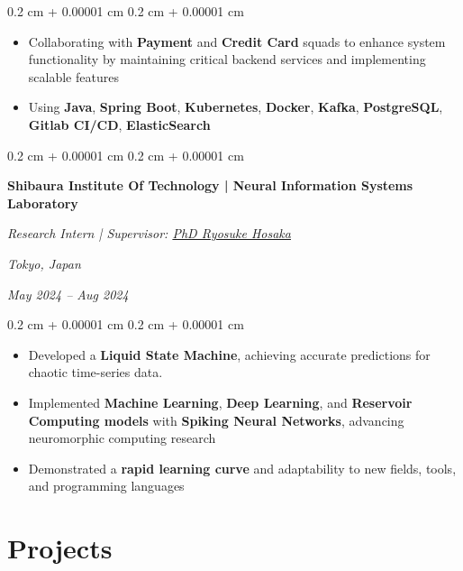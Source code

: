 \documentclass[10pt, letterpaper]{article}
\newenvironment{highlights}{
    \begin{itemize}[
        topsep=0.10 cm,
        parsep=0.10 cm,
        partopsep=0pt,
        itemsep=0pt,
        leftmargin=0.4 cm + 10pt
    ]
}{
    \end{itemize}
} %
\newenvironment{onecolentry}{
    \begin{adjustwidth}{
        0.2 cm + 0.00001 cm
    }{
        0.2 cm + 0.00001 cm
    }
}{
    \end{adjustwidth}
} %
\newenvironment{twocolentry}[2][]{
    \onecolentry
    \def\secondColumn{#2}
    \setcolumnwidth{\fill, 4.5 cm}
    \begin{paracol}{2}
}{
    \switchcolumn \raggedleft \secondColumn
    \end{paracol}
    \endonecolentry
} %
\let\hrefWithoutArrow\href
\renewcommand{\href}[2]{\hrefWithoutArrow{#1}{\ifthenelse{\equal{#2}{}}{ }{#2 }\raisebox{.15ex}{\footnotesize \faExternalLink*}}}
\begin{document}
        \vspace{0.10 cm}
        \begin{onecolentry}
            \begin{highlights}
                \item Collaborating with \textbf{Payment} and \textbf{Credit Card} squads to enhance system functionality by maintaining critical backend services and implementing scalable features
                \item Using \textbf{Java}, \textbf{Spring Boot}, \textbf{Kubernetes}, \textbf{Docker}, \textbf{Kafka}, \textbf{PostgreSQL}, \textbf{Gitlab CI/CD}, \textbf{ElasticSearch}
            \end{highlights}
        \end{onecolentry}   

        \begin{twocolentry}{
        \textit{Tokyo, Japan}    
            
        \textit{May 2024 – Aug 2024}}
            \textbf{Shibaura Institute Of Technology | \textcolor{clearblue}{Neural Information Systems \mbox{Laboratory}}}
            
            \textit{Research Intern | Supervisor: \hrefWithoutArrow{mailto:r-hosaka@shibaura-it.ac.jp}{\color{black}{\footnotesize\faEnvelope[regular]}\hspace*{0.13cm}PhD Ryosuke Hosaka}}
        \end{twocolentry}

        \vspace{0.10 cm}
        \begin{onecolentry}
            \begin{highlights}
                \item Developed a \textbf{Liquid State Machine}, achieving accurate predictions for chaotic time-series data.
                \item Implemented \textbf{Machine Learning}, \textbf{Deep Learning}, and \textbf{Reservoir Computing models} with \textbf{Spiking Neural Networks}, advancing neuromorphic computing research
                \item Demonstrated a \textbf{rapid learning curve} and adaptability to new fields, tools, and programming languages
            \end{highlights}
        \end{onecolentry}    
    
    \section{Projects}
\end{document}
